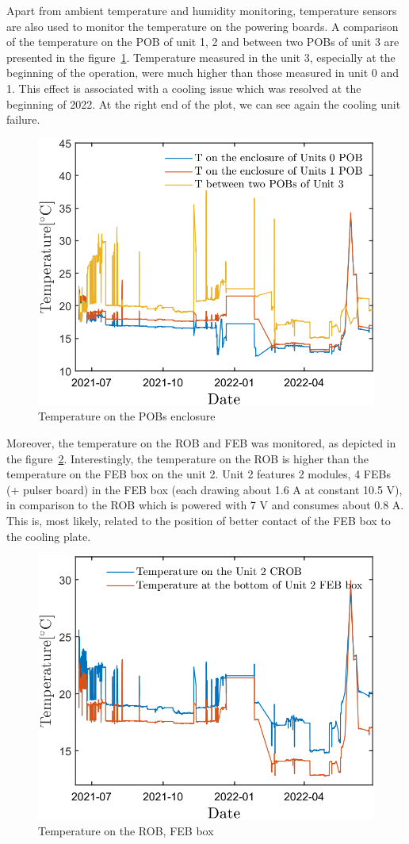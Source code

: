 Apart from ambient temperature and humidity monitoring, temperature sensors are also used to monitor the temperature on the powering boards. A comparison of the temperature on the \gls{POB} of unit 1, 2 and between two POBs of unit 3 are presented in the figure~\ref{fig_POB1}. Temperature measured in the unit 3, especially at the beginning of the operation, were much higher than those measured in unit 0 and 1. This effect is associated with a cooling issue which was resolved at the beginning of 2022. At the right end of the plot, we can see again the cooling unit failure. 
\begin{figure}[!h]
\centering
\includegraphics[width=0.55\columnwidth]{Chapter6/DCS/images/POB1.png}
\caption{Temperature on the POBs enclosure}
\label{fig_POB1}
\end{figure}
\newpage
Moreover, the temperature on the \gls{ROB} and \gls{FEB} was monitored, as depicted in the figure~\ref{fig_robvsfeb}. Interestingly, the temperature on the \gls{ROB} is higher than the temperature on the \gls{FEB} box on the unit 2. Unit 2 features 2 modules, 4 \gls{FEB}s (+ pulser board) in the \gls{FEB} box (each drawing about 1.6 A at constant 10.5 V), in comparison to the \gls{ROB} which is powered with 7 V and consumes about 0.8 A. This is, most likely, related to the position of better contact of the \gls{FEB} box to the cooling plate.

\begin{figure}[!h]
\centering
\includegraphics[width=0.55\columnwidth]{Chapter6/DCS/images/ROBvsFEB.png}
\caption{Temperature on the \gls{ROB}, \gls{FEB} box}
\label{fig_robvsfeb}
\end{figure}

